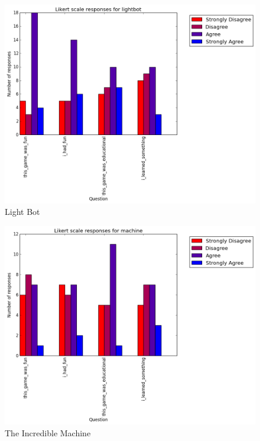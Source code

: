 			\begin{figure}[h] 
			\centering 
			\includegraphics[width=\textwidth]{lightbot_likert.png} 
			\caption{Light Bot}
			\end{figure}

			\begin{figure}[h] 
			\centering 
			\includegraphics[width=\textwidth]{machine_likert.png} 
			\caption{The Incredible Machine}
			\end{figure}

